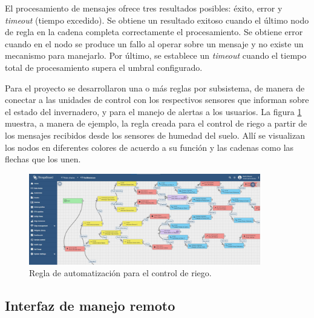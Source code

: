 El procesamiento de mensajes ofrece tres resultados posibles: éxito, error y \textit{timeout} (tiempo excedido).  Se obtiene un resultado exitoso cuando el último nodo de regla en la cadena completa correctamente el procesamiento. Se obtiene error cuando en el nodo se produce un fallo al operar sobre un mensaje y no existe un mecanismo para manejarlo. Por último, se establece un \textit{timeout} cuando el tiempo total de procesamiento supera el umbral configurado.



Para el proyecto se desarrollaron una o más reglas por subsistema, de manera de conectar a las unidades de control con los respectivos sensores que informan sobre el estado del invernadero, y para el manejo de alertas a los usuarios. La figura \ref{fig:rule_riego} muestra, a manera de ejemplo, la regla creada para el control de riego a partir de los mensajes recibidos desde los sensores de humedad del suelo. Allí se visualizan los nodos en diferentes colores de acuerdo a su función y las cadenas como las flechas que los unen.

\begin{figure}[!h]
	\centering
	\includegraphics[width=0.9\textwidth]{./Figures/chapter3/TB_Rule_Soil.jpg}
	\caption[Regla de automatización para el control de riego]{Regla de automatización para el control de riego.}
	\label{fig:rule_riego}
\end{figure}

\subsection{Interfaz de manejo remoto}
\label{sec:Interfaz de manejo remoto}



